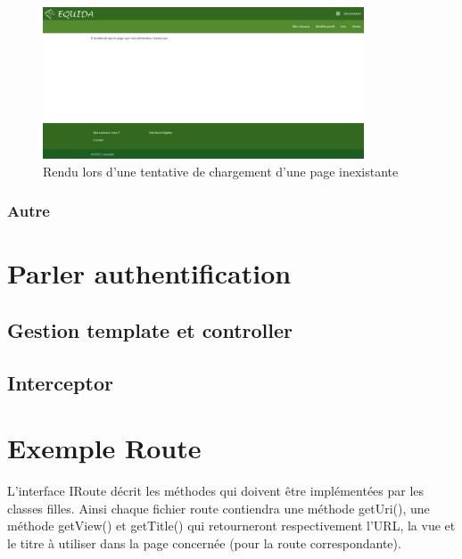				\begin{figure}[H]
					\centering\includegraphics[width=0.85\textwidth, keepaspectratio]{res/exempleErreur404.png}
					\caption{Rendu lors d'une tentative de chargement d'une page inexistante}
				\end{figure}

			\subsubsection{Autre}


	\section{Parler authentification}

		\subsection{Gestion template et controller}


		\label{interceptor} \subsection{Interceptor}


	\section{Exemple Route}

		L'interface IRoute décrit les méthodes qui doivent être implémentées par les classes filles.\newline
		Ainsi chaque fichier route contiendra une méthode getUri(), une méthode getView() et getTitle() qui retourneront respectivement l'URL, la vue et le titre à utiliser dans la page concernée (pour la route correspondante).


